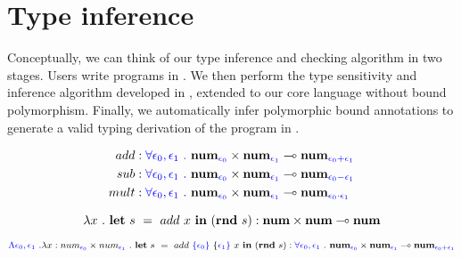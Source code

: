 \section{Type inference}

Conceptually, we can think of our type inference and checking algorithm in two
stages. Users write programs in \Lang. We then perform the type sensitivity and
inference algorithm developed in \cite{NumFuzz}, extended to our core language
without bound polymorphism. Finally, we automatically infer polymorphic bound
annotations to generate a valid typing derivation of the program in \bnd{\Lang}.

\begin{equation}
  \begin{aligned}[c]
    add &: \textcolor{blue}{\forall \epsilon_0, \epsilon_1 \ .} \
    \textbf{num}_{\textcolor{blue}{\epsilon_0}} \times \textbf{num}_{\textcolor{blue}{\epsilon_1}}
    \multimap \textbf{num}_{\textcolor{blue}{\epsilon_0 + \epsilon_1}} \\
    sub &: \textcolor{blue}{\forall \epsilon_0, \epsilon_1 \ .} \
    \textbf{num}_{\textcolor{blue}{\epsilon_0}} \times \textbf{num}_{\textcolor{blue}{\epsilon_1}}
    \multimap \textbf{num}_{\textcolor{blue}{\epsilon_0 - \epsilon_1}} \\
    mult &: \textcolor{blue}{\forall \epsilon_0, \epsilon_1 \ .} \
    \textbf{num}_{\textcolor{blue}{\epsilon_0}} \times \textbf{num}_{\textcolor{blue}{\epsilon_1}}
    \multimap \textbf{num}_{\textcolor{blue}{\epsilon_0 \cdot \epsilon_1}} \\
  \end{aligned}
\end{equation}

\begin{example}
  \begin{equation}
    \lambda x \ . \ \mathbf{let} \ s \ = \ add \ x \ \tin \ (\mathbf{rnd} \ s)
    : \textbf{num} \times \textbf{num} \multimap \textbf{num}
  \end{equation}
\end{example}
\begin{example}
  \begin{equation}
    \bnd{\Lambda \epsilon_0, \epsilon_1 \ .} \lambda x : num_{\bnd{\epsilon_0}}
    \times num_{\bnd{\epsilon_1}} \ . \ 
    \mathbf{let} \ s \ = \ add \ \bnd{\{\epsilon_0\}} \ \{\bnd{\epsilon_1\}} \ x
    \ \tin \ (\mathbf{rnd} \ s)
    : 
    \bnd{\forall \epsilon_0, \epsilon_1 \ .} \ 
    \textbf{num}_{\bnd{\epsilon_0}} \times \textbf{num}_{\bnd{\epsilon_1}}
    \multimap
    \textbf{num}_{\bnd{\epsilon_0 + \epsilon_1}}
  \end{equation}
\end{example}

